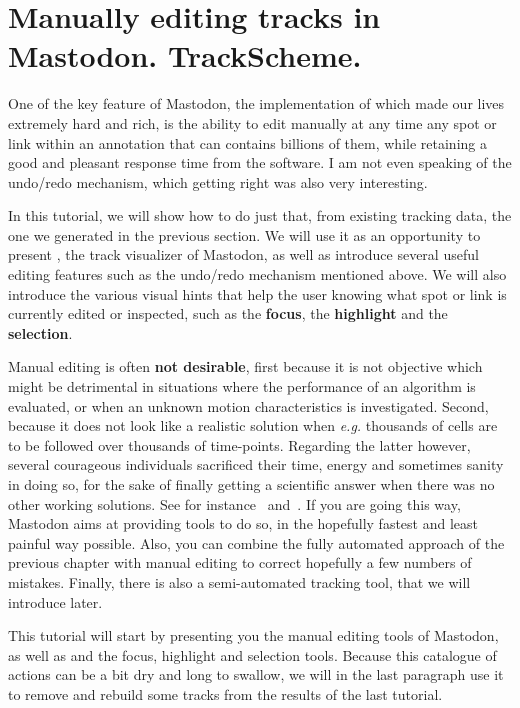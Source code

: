 \section{Manually editing tracks in Mastodon. TrackScheme.}
\label{sec:ManuelEditing}

One of the key feature of Mastodon, the implementation of which made our lives extremely hard and rich, is the ability to edit manually at any time any spot or link within an annotation that can contains billions of them, while retaining a good and pleasant response time from the software.
I am not even speaking of the undo/redo mechanism, which getting right was also very interesting. 

In this tutorial, we will show how to do just that, from existing tracking data, the one we generated in the previous section. 
We will use it as an opportunity to present \TrackScheme, the track visualizer of Mastodon, as well as introduce several useful editing features such as the undo/redo mechanism mentioned above.
We will also introduce the various visual hints that help the user knowing what spot or link is currently edited or inspected, such as the \textbf{focus}, the \textbf{highlight} and the \textbf{selection}.

Manual editing is often \textbf{not desirable}, first because it is not objective which might be detrimental in situations where the performance of an algorithm is evaluated, or when an unknown motion characteristics is investigated. 
Second, because it does not look like a realistic solution when \textit{e.g.} thousands of cells are to be followed over thousands of time-points.
Regarding the latter however, several courageous individuals sacrificed their time, energy and sometimes sanity in doing so, for the sake of finally getting a scientific answer when there was no other working solutions. 
See for instance~\cite{MaMuT} and~\cite{McDole2018}.
If you are going this way, Mastodon aims at providing tools to do so, in the hopefully fastest and least painful way possible. 
Also, you can combine the fully automated approach of the previous chapter with manual editing to correct hopefully a few numbers of mistakes.
Finally, there is also a semi-automated tracking tool, that we will introduce later.

This tutorial will start by presenting you the manual editing tools of Mastodon, as well as \TrackScheme and the focus, highlight and selection tools.
Because this catalogue of actions can be a bit dry and long to swallow, we will in the last paragraph use it to remove and rebuild some tracks from the results of the last tutorial.



